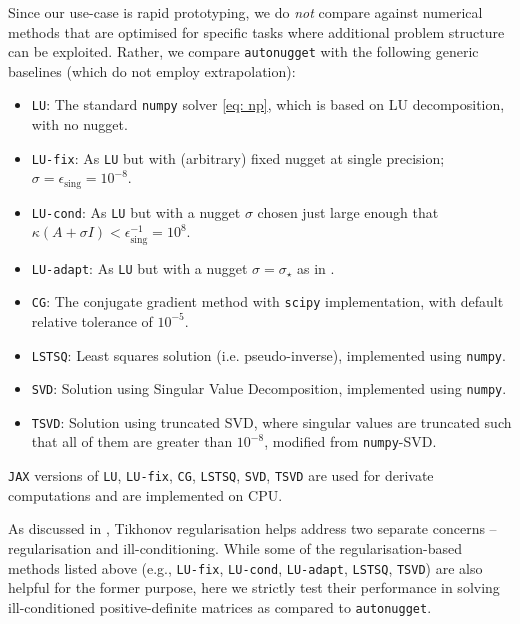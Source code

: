 \documentclass[10pt]{article} %
\newcommand{\nugget}{\sigma}
\begin{document}
Since our use-case is rapid prototyping, we do \emph{not} compare against numerical methods that are optimised for specific tasks where additional problem structure can be exploited.
Rather, we compare \texttt{autonugget} 
with the following generic baselines (which do not employ extrapolation):
\begin{itemize}
\item \texttt{LU}: The standard \texttt{numpy} solver \eqref{eq: np}, which is based on LU decomposition, with no nugget.
\item \texttt{LU-fix}: As \texttt{LU} but with (arbitrary) fixed nugget at single precision; $\sigma = \epsilon_{\mathrm{sing}} = 10^{-8}$.
\item \texttt{LU-cond}: As \texttt{LU} but with a nugget $\nugget$ chosen just large enough that $\kappa(A + \nugget I) < \epsilon_{\mathrm{sing}}^{-1} = 10^8$.
\item \texttt{LU-adapt}: As \texttt{LU} but with a nugget $\nugget = \nugget_\star$ as in . 
\item \texttt{CG}: The conjugate gradient method \citep{hestenes1952methods} with \texttt{scipy} implementation, with default relative tolerance of $10^{-5}$.  
\item \texttt{LSTSQ}: Least squares solution (i.e. pseudo-inverse), implemented using \texttt{numpy}.
\item \texttt{SVD}: Solution using Singular Value Decomposition, implemented using \texttt{numpy}.
\item \texttt{TSVD}: Solution using truncated SVD, where singular values are truncated such that all of them are greater than $10^{-8}$, modified from \texttt{numpy}-SVD.
\end{itemize}



\texttt{JAX} versions of \texttt{LU}, \texttt{LU-fix}, \texttt{CG}, \texttt{LSTSQ}, \texttt{SVD}, \texttt{TSVD} are used for derivate computations and are implemented on CPU. 

As discussed in , Tikhonov regularisation helps address two separate concerns -- regularisation and ill-conditioning. While some of the regularisation-based methods listed above (e.g., \texttt{LU-fix}, \texttt{LU-cond}, \texttt{LU-adapt}, \texttt{LSTSQ}, \texttt{TSVD}) are also helpful for the former purpose, here we strictly test their performance in solving ill-conditioned positive-definite matrices as compared to \texttt{autonugget}.
\end{document}
